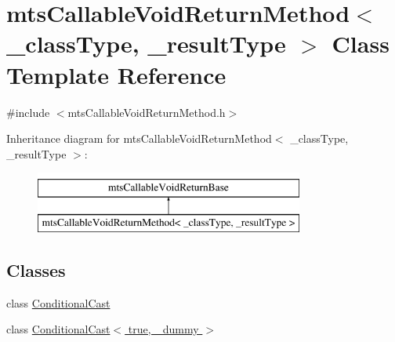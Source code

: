 \hypertarget{classmts_callable_void_return_method}{\section{mts\-Callable\-Void\-Return\-Method$<$ \-\_\-class\-Type, \-\_\-result\-Type $>$ Class Template Reference}
\label{classmts_callable_void_return_method}
}


{\ttfamily \#include $<$mts\-Callable\-Void\-Return\-Method.\-h$>$}

Inheritance diagram for mts\-Callable\-Void\-Return\-Method$<$ \-\_\-class\-Type, \-\_\-result\-Type $>$\-:\begin{figure}[H]
\begin{center}
\leavevmode
\includegraphics[height=2.000000cm]{d1/d1f/classmts_callable_void_return_method}
\end{center}
\end{figure}
\subsection*{Classes}
\begin{DoxyCompactItemize}
\item 
class \hyperlink{classmts_callable_void_return_method_1_1_conditional_cast}{Conditional\-Cast}
\item 
class \hyperlink{classmts_callable_void_return_method_1_1_conditional_cast_3_01true_00_01__dummy_01_4}{Conditional\-Cast$<$ true, \-\_\-dummy $>$}
\end{DoxyCompactItemize}

